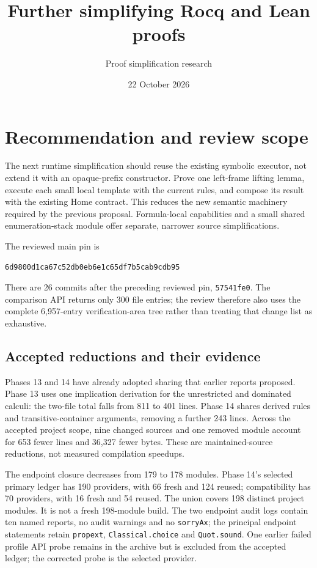 \documentclass[11pt]{article}
\title{Further simplifying Rocq and Lean proofs}
\author{Proof simplification research}\date{22 October 2026}
\newcommand{\code}[1]{\texttt{#1}}
\begin{document}
\maketitle
\section{Recommendation and review scope}
The next runtime simplification should reuse the existing symbolic executor, not extend it with an opaque-prefix constructor. Prove one left-frame lifting lemma, execute each small local template with the current rules, and compose its result with the existing Home contract. This reduces the new semantic machinery required by the previous proposal. Formula-local capabilities and a small shared enumeration-stack module offer separate, narrower source simplifications.

The reviewed main pin is
\begin{verbatim}
6d9800d1ca67c52db0eb6e1c65df7b5cab9cdb95
\end{verbatim}
There are 26 commits after the preceding reviewed pin, \code{57541fe0}. The comparison API returns only 300 file entries; the review therefore also uses the complete 6,957-entry verification-area tree rather than treating that change list as exhaustive.

\subsection{Accepted reductions and their evidence}
Phases 13 and 14 have already adopted sharing that earlier reports proposed. Phase 13 uses one implication derivation for the unrestricted and dominated calculi: the two-file total falls from 811 to 401 lines. Phase 14 shares derived rules and transitive-container arguments, removing a further 243 lines. Across the accepted project scope, nine changed sources and one removed module account for 653 fewer lines and 36,327 fewer bytes. These are maintained-source reductions, not measured compilation speedups.

The endpoint closure decreases from 179 to 178 modules. Phase 14's selected primary ledger has 190 providers, with 66 fresh and 124 reused; compatibility has 70 providers, with 16 fresh and 54 reused. The union covers 198 distinct project modules. It is not a fresh 198-module build. The two endpoint audit logs contain ten named reports, no audit warnings and no \code{sorryAx}; the principal endpoint statements retain \code{propext}, \code{Classical.choice} and \code{Quot.sound}. One earlier failed profile API probe remains in the archive but is excluded from the accepted ledger; the corrected probe is the selected provider.
\end{document}
